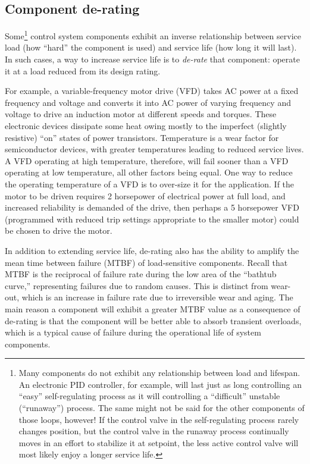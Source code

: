 \filbreak
\subsection{Component de-rating}

Some\footnote{Many components do not exhibit any relationship between load and lifespan.  An electronic PID controller, for example, will last just as long controlling an ``easy'' self-regulating process as it will controlling a ``difficult'' unstable (``runaway'') process.  The same might not be said for the other components of those loops, however!  If the control valve in the self-regulating process rarely changes position, but the control valve in the runaway process continually moves in an effort to stabilize it at setpoint, the less active control valve will most likely enjoy a longer service life.} control system components exhibit an inverse relationship between service load (how ``hard'' the component is used) and service life (how long it will last).  In such cases, a way to increase service life is to \textit{de-rate} that component: operate it at a load reduced from its design rating.  

For example, a variable-frequency motor drive (VFD) takes AC power at a fixed frequency and voltage and converts it into AC power of varying frequency and voltage to drive an induction motor at different speeds and torques.  These electronic devices dissipate some heat owing mostly to the imperfect (slightly resistive) ``on'' states of power transistors.  Temperature is a wear factor for semiconductor devices, with greater temperatures leading to reduced service lives.  A VFD operating at high temperature, therefore, will fail sooner than a VFD operating at low temperature, all other factors being equal.  One way to reduce the operating temperature of a VFD is to over-size it for the application.  If the motor to be driven requires 2 horsepower of electrical power at full load, and increased reliability is demanded of the drive, then perhaps a 5 horsepower VFD (programmed with reduced trip settings appropriate to the smaller motor) could be chosen to drive the motor.    

In addition to extending service life, de-rating also has the ability to amplify the mean time between failure (MTBF) of load-sensitive components.  Recall that MTBF is the reciprocal of failure rate during the low area of the ``bathtub curve,'' representing failures due to random causes.  This is distinct from wear-out, which is an increase in failure rate due to irreversible wear and aging.  The main reason a component will exhibit a greater MTBF value as a consequence of de-rating is that the component will be better able to absorb transient overloads, which is a typical cause of failure during the operational life of system components.


